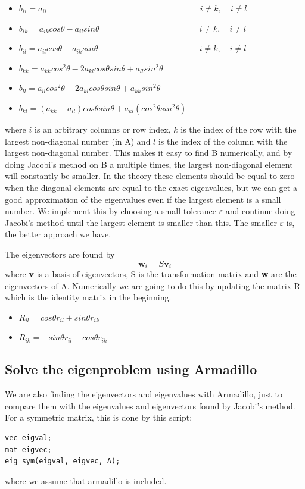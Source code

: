 \documentclass[norsk,a4paper,12pt]{article}
\begin{document}
\begin{itemize}
\item $b_{ii}=a_{ii}\quad\quad\quad\quad\quad\quad\quad\quad\quad\quad\quad\quad\quad\quad\quad\quad\quad\quad\,\, i\not=k,\quad i\not= l$
\item $b_{ik}=a_{ik}cos\theta-a_{il}sin\theta\quad\quad\quad\quad\quad\quad\quad\quad\quad\quad\quad\quad i\not=k,\quad i\not= l$
\item $b_{il}=a_{il}cos\theta+a_{ik}sin\theta\quad\quad\quad\quad\quad\quad\quad\quad\quad\quad\quad\quad\, i\not=k,\quad i\not= l$
\item $b_{kk}=a_{kk}cos^2\theta-2a_{kl}cos\theta sin\theta +a_{ll}sin^2\theta$
\item $b_{ll}=a_{ll}cos^2\theta+2a_{kl}cos\theta sin\theta +a_{kk}sin^2\theta$
\item $b_{kl}=(a_{kk}-a_{ll})cos\theta sin\theta + a_{kl}(cos^2\theta sin^2\theta)$
\end{itemize}
where $i$ is an arbitrary columns or row index, $k$ is the index of the row with the largest non-diagonal number (in A) and $l$ is the index of the column with the largest non-diagonal number. This makes it easy to find B numerically, and by doing Jacobi's method on B a multiple times, the largest non-diagonal element will constantly be smaller. In the theory these elements should be equal to zero when the diagonal elements are equal to the exact eigenvalues, but we can get a good approximation of the eigenvalues even if the largest element is a small number. We implement this by choosing a small tolerance $\varepsilon$ and continue doing Jacobi's method until the largest element is smaller than this. The smaller $\varepsilon$ is, the better approach we have.\par\vspace{3mm}
The eigenvectors are found by
\begin{equation}
\textbf{w}_i=S\textbf{v}_i
\end{equation}
where \textbf{v} is a basis of eigenvectors, S is the transformation matrix and \textbf{w} are the eigenvectors of A. Numerically we are going to do this by updating the matrix R which is the identity matrix in the beginning. 
\begin{itemize}
\item $R_{il}=cos\theta r_{il}+sin\theta r_{ik}$
\item $R_{ik}=-sin\theta r_{il}+cos\theta r_{ik}$
\end{itemize}

\subsection{Solve the eigenproblem using Armadillo}
We are also finding the eigenvectors and eigenvalues with Armadillo, just to compare them with the eigenvalues and eigenvectors found by Jacobi's method. For a symmetric matrix, this is done by this script:
\begin{lstlisting}
vec eigval;
mat eigvec;
eig_sym(eigval, eigvec, A);
\end{lstlisting}
where we assume that armadillo is included. 
\end{document}
